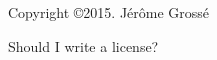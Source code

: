 \begin{flushleft}

Copyright \copyright  2015. Jérôme Grossé

Should I write a license?

\end{flushleft}